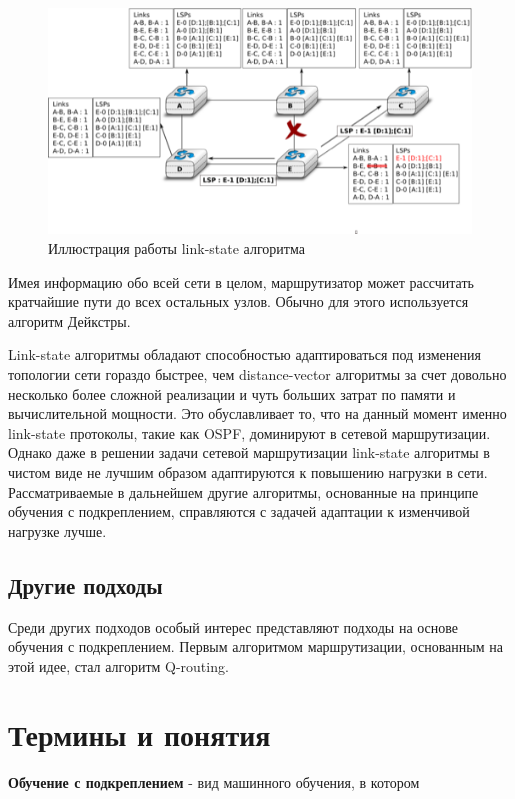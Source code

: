 \documentclass[]{itmo-student-thesis}
\begin{document}
\begin{figure}[!h]
  \caption{Иллюстрация работы link-state алгоритма}\label{ospf-img}
  \centering
  \includegraphics[scale=1.5]{ls-twoway}
\end{figure}

Имея информацию обо всей сети в целом, маршрутизатор может рассчитать кратчайшие
пути до всех остальных узлов. Обычно для этого используется алгоритм
Дейкстры\cite{dijkstra}. 

Link-state алгоритмы обладают способностью адаптироваться под изменения
топологии сети гораздо быстрее, чем distance-vector алгоритмы за счет довольно
несколько более сложной реализации и чуть больших затрат по памяти и
вычислительной мощности. Это обуславливает то, что на данный момент именно
link-state протоколы, такие как OSPF\cite{ospf-rfc}, доминируют в сетевой
маршрутизации. Однако даже в решении задачи сетевой маршрутизации link-state
алгоритмы в чистом виде не лучшим образом адаптируются к повышению нагрузки в
сети. Рассматриваемые в дальнейшем другие алгоритмы, основанные на принципе
обучения с подкреплением, справляются с задачей адаптации к
изменчивой нагрузке лучше.

\subsection{Другие подходы}

Среди других подходов особый интерес представляют подходы на основе обучения с
подкреплением. Первым алгоритмом маршрутизации, основанным на этой идее, стал
алгоритм Q-routing. 

\section{Термины и понятия}

\textbf{Обучение с подкреплением} - вид машинного обучения, в котором \textit{}
\end{document}
